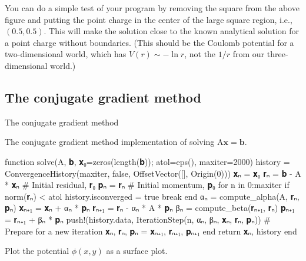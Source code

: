 You can do a simple test of your program by
removing the square from the above figure and putting the point charge in the center of the
large square region, i.e., \((0.5, 0.5)\). This will make the solution close to the known
analytical solution for a point charge without boundaries. (This should be the Coulomb
potential for a two-dimensional world, which has \(V(r) \sim -\ln r\), not the \(1/r\)
from our three-dimensional world.)

\subsection{The conjugate gradient method}

The conjugate gradient method


\begin{algorithm}
    \caption{The conjugate gradient method implementation of solving
        \(\mathrm{ A }\mathbf{ x } = \mathbf{ b }\).}
    \label{lst:cg}
    \begin{juliacode}
function solve(A, 𝐛, 𝐱₀=zeros(length(𝐛)); atol=eps(), maxiter=2000)
    history = ConvergenceHistory(maxiter, false, OffsetVector([], Origin(0)))
    𝐱ₙ = 𝐱₀
    𝐫ₙ = 𝐛 - A * 𝐱ₙ  # Initial residual, 𝐫₀
    𝐩ₙ = 𝐫ₙ  # Initial momentum, 𝐩₀
    for n in 0:maxiter
        if norm(𝐫ₙ) < atol
            history.isconverged = true
            break
        end
        αₙ = compute_alpha(A, 𝐫ₙ, 𝐩ₙ)
        𝐱ₙ₊₁ = 𝐱ₙ + αₙ * 𝐩ₙ
        𝐫ₙ₊₁ = 𝐫ₙ - αₙ * A * 𝐩ₙ
        βₙ = compute_beta(𝐫ₙ₊₁, 𝐫ₙ)
        𝐩ₙ₊₁ = 𝐫ₙ₊₁ + βₙ * 𝐩ₙ
        push!(history.data, IterationStep(n, αₙ, βₙ, 𝐱ₙ, 𝐫ₙ, 𝐩ₙ))
        # Prepare for a new iteration
        𝐱ₙ, 𝐫ₙ, 𝐩ₙ = 𝐱ₙ₊₁, 𝐫ₙ₊₁, 𝐩ₙ₊₁
    end
    return 𝐱ₙ, history
end
    \end{juliacode}
\end{algorithm}


\Question{} Plot the potential \(\phi(x, y)\) as a surface plot.
\newline
